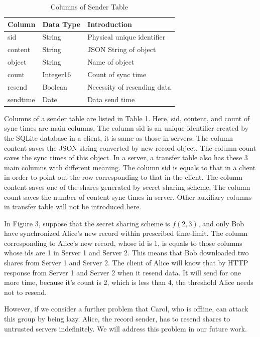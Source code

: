 \documentclass[twocolumn,10pt]{article}
\begin{document}
\begin{table}[tbp]
	\centering  
	\begin{tabular}{lll}  
		\hline
		Column &Data Type & Introduction\\ 
		\hline  
		sid &String & Physical unique identifier\\
		content & String & JSON String of object\\ 
		object & String & Name of object\\
		count & Integer16 & Count of sync time\\
		resend & Boolean &Necessity of resending data \\
		sendtime & Date & Data send time\\
		\hline
	\end{tabular}
	\caption{Columns of Sender Table}
\end{table}

Columns of a sender table are listed in Table 1. Here, sid, content, and count of sync times are main columns. The column  sid is an unique identifier created by the SQLite database in a client, it is same as those in servers. The column content saves the JSON string converted by new record object. The column count saves the sync times of this object. In a server, a transfer table also has these 3 main columns with different meaning. The column sid is equals to that in a client in order to point out the row corresponding to that in the client. The column content saves one of the shares generated by secret sharing scheme. The column count saves the number of content sync times in server. Other auxiliary columns in transfer table will not be introduced here.

In Figure 3, suppose that the secret sharing scheme is $f(2, 3)$, and only Bob have synchronized Alice's new record within prescribed time-limit. The column corresponding to Alice's new record, whose id is 1, is equals to those columns whose ids are 1 in Server 1 and Server 2. This means that Bob downloaded two shares from Server 1 and Server 2. The client of Alice will know that by HTTP response from Server 1 and Server 2 when it resend data. It will send for one more time, because it's count is 2, which is less than 4, the threshold Alice needs not to resend.

However, if we consider a further problem that Carol, who is offline, can attack this group by being lazy. Alice, the record sender, has to resend shares to untrusted servers indefinitely. We will address this problem in our future work. 
\end{document}
